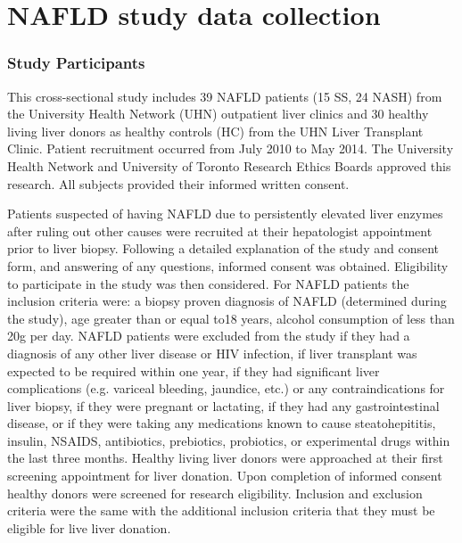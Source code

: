 \chapter{NAFLD study data collection}\label{AppB}

\subsection{Study Participants}
This cross-sectional study includes 39 NAFLD patients (15 SS, 24 NASH) from the University Health Network (UHN) outpatient liver clinics and 30 healthy living liver donors as healthy controls (HC) from the UHN Liver Transplant Clinic. Patient recruitment occurred from July 2010 to May 2014. The University Health Network and University of Toronto Research Ethics Boards approved this research. All subjects provided their informed written consent.

Patients suspected of having NAFLD due to persistently elevated liver enzymes after ruling out other causes were recruited at their hepatologist appointment prior to liver biopsy. Following a detailed explanation of the study and consent form, and answering of any questions, informed consent was obtained. Eligibility to participate in the study was then considered. For NAFLD patients the inclusion criteria were: a biopsy proven diagnosis of NAFLD (determined during the study), age greater than or equal to18 years, alcohol consumption of less than 20g per day. NAFLD patients were excluded from the study if they had a diagnosis of any other liver disease or HIV infection, if liver transplant was expected to be required within one year, if they had significant liver complications (e.g. variceal bleeding, jaundice, etc.) or any contraindications for liver biopsy, if they were pregnant or lactating, if they had any gastrointestinal disease, or if they were taking any medications known to cause steatohepititis, insulin, NSAIDS, antibiotics, prebiotics, probiotics, or experimental drugs within the last three months. Healthy living liver donors were approached at their first screening appointment for liver donation. Upon completion of informed consent healthy donors were screened for research eligibility. Inclusion and exclusion criteria were the same with the additional inclusion criteria that they must be eligible for live liver donation.

